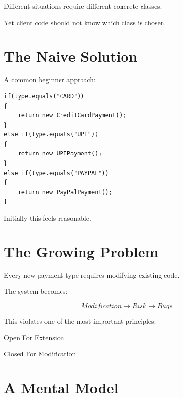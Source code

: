 \documentclass[11pt,a4paper]{book}
\begin{document}
Different situations require different concrete classes.

Yet client code should not know which class is chosen.


\section{The Naive Solution}

A common beginner approach:

\begin{verbatim}
if(type.equals("CARD"))
{
    return new CreditCardPayment();
}
else if(type.equals("UPI"))
{
    return new UPIPayment();
}
else if(type.equals("PAYPAL"))
{
    return new PayPalPayment();
}
\end{verbatim}

Initially this feels reasonable.


\section{The Growing Problem}

\begin{trap}

Every new payment type requires modifying
existing code.

The system becomes:

\[
Modification
\rightarrow
Risk
\rightarrow
Bugs
\]

\end{trap}

This violates one of the most important principles:

\begin{center}
Open For Extension

Closed For Modification
\end{center}


\section{A Mental Model}
\end{document}
